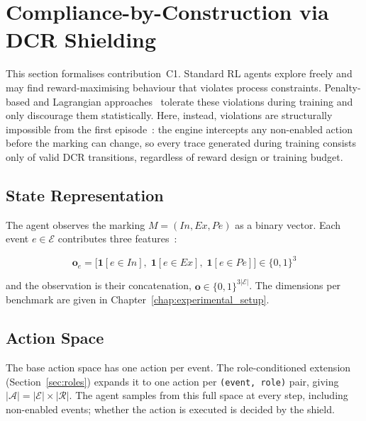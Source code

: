 \section{Compliance-by-Construction via DCR Shielding}
\label{sec:compliance}

This section formalises contribution~C1. Standard \ac{RL} agents
explore freely and may find reward-maximising behaviour that violates
process constraints. Penalty-based and Lagrangian
approaches~\cite{AltmanCONSTRAINEDPROCESSES, Achiam2017ConstrainedOptimization,
Huang2011ReinforcementManagement} tolerate these violations during
training and only discourage them statistically. Here, instead,
violations are structurally impossible from the first
episode~\cite{Alshiekh2017SafeShielding}: the engine intercepts any non-enabled
action before the marking can change, so every trace generated during
training consists only of valid \ac{DCR} transitions, regardless of
reward design or training budget.

\subsection{State Representation}
\label{sec:state}

The agent observes the marking
$M = (\mathit{In}, \mathit{Ex}, \mathit{Pe})$ as a binary vector.
Each event $e \in \mathcal{E}$ contributes three
features~\cite{Diaz2024Pareto-OptimalModels, Trinh2024OnOfConstraints}:

\begin{equation}
\mathbf{o}_e =
\bigl[\mathbf{1}[e \in \mathit{In}],\;
      \mathbf{1}[e \in \mathit{Ex}],\;
      \mathbf{1}[e \in \mathit{Pe}]\bigr]
\in \{0,1\}^3
\end{equation}

and the observation is their concatenation,
$\mathbf{o} \in \{0,1\}^{3|\mathcal{E}|}$. The dimensions per
benchmark are given in Chapter~\ref{chap:experimental_setup}.

\subsection{Action Space}
\label{sec:action_space}

The base action space has one action per event. The role-conditioned
extension (Section~\ref{sec:roles}) expands it to one action per
\texttt{(event, role)} pair, giving
$|\mathcal{A}| = |\mathcal{E}| \times |\mathcal{R}|$. The agent
samples from this full space at every step, including non-enabled
events; whether the action is executed is decided by the shield.

